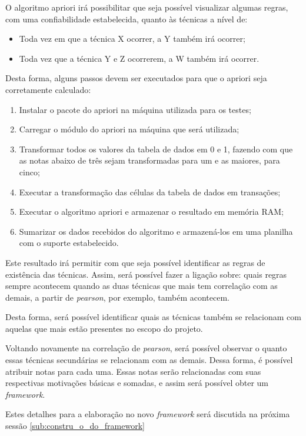 O algoritmo apriori irá possibilitar que seja possível visualizar algumas regras, com uma confiabilidade estabelecida,
quanto às técnicas a nível de:
\begin{itemize}
    \item Toda vez em que a técnica X ocorrer, a Y também irá ocorrer;
    \item Toda vez que a técnica Y e Z ocorrerem, a W também irá ocorrer.
\end{itemize}

Desta forma, alguns passos devem ser executados para que o apriori seja corretamente calculado:

\begin{enumerate}
    \item Instalar o pacote do apriori na máquina utilizada para os testes;
    \item Carregar o módulo do apriori na máquina que será utilizada;
    \item Transformar todos os valores da tabela de dados em 0 e 1, fazendo com que as notas abaixo de três
        sejam transformadas para um e as maiores, para cinco;
    \item Executar a transformação das células da tabela de dados em transações;
    \item Executar o algoritmo apriori e armazenar o resultado em memória RAM;
    \item Sumarizar os dados recebidos do algoritmo e armazená-los em uma planilha com o suporte
        estabelecido.
\end{enumerate}

Este resultado irá permitir com que seja possível identificar as regras de existência das técnicas. Assim, será possível fazer
a ligação sobre: quais regras sempre acontecem quando as duas técnicas que mais tem correlação com as demais, a partir de \textit{pearson},
por exemplo, também acontecem.


Desta forma, será possível identificar quais as técnicas também se relacionam com aquelas que mais estão presentes no escopo do
projeto.

Voltando novamente na correlação de \textit{pearson}, será possível observar o quanto essas técnicas secundárias se relacionam com as demais. 
Dessa forma, é possível atribuir notas para cada uma. Essas notas serão relacionadas com suas respectivas motivações básicas e somadas, e assim
será possível obter um \textit{framework}.

Estes detalhes para a elaboração no novo \textit{framework} será discutida na próxima sessão \ref{sub:constru_o_do_framework}

